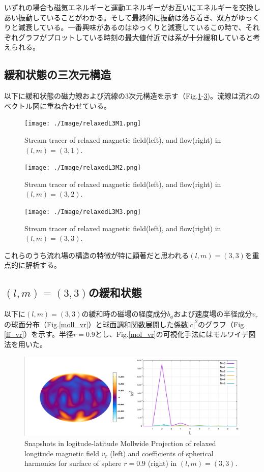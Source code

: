 \documentclass[12pt]{jsarticle}
\begin{document}
いずれの場合も磁気エネルギーと運動エネルギーがお互いにエネルギーを交換しあい振動していることがわかる。そして最終的に振動は落ち着き、双方がゆっくりと減衰している。一番興味があるのはゆっくりと減衰しているこの時で、それぞれグラフがプロットしている時刻の最大値付近では系が十分緩和していると考えられる。


\subsection{緩和状態の三次元構造}
以下に緩和状態の磁力線および流線の3次元構造を示す（Fig.\ref{L3M1_relaxed}-\ref{L3M3_relaxed})。流線は流れのベクトル図に重ね合わせている。

\begin{figure}[H]
\centering
\texttt{[image: ./Image/relaxedL3M1.png]}
\caption{Stream tracer of relaxed magnetic field(left), and flow(right) in $(l,m)=(3,1)$.} \label{L3M1_relaxed}
\end{figure}
\begin{figure}[H]
\centering
\texttt{[image: ./Image/relaxedL3M2.png]}
\caption{Stream tracer of relaxed magnetic field(left), and flow(right) in $(l,m)=(3,2)$.} \label{L3M2_relaxed}
\end{figure}
\begin{figure}[H]
\centering
\texttt{[image: ./Image/relaxedL3M3.png]}
\caption{Stream tracer of relaxed magnetic field(left), and flow(right) in $(l,m)=(3,3)$.}\label{L3M3_relaxed}
\end{figure}

これらのうち流れ場の構造の特徴が特に顕著だと思われる$(l,m)=(3,3)$を重点的に解析する。

\subsection{$(l,m)=(3,3)$の緩和状態}
以下に$(l,m)=(3,3)$の緩和時の磁場の経度成分$b_\phi$および速度場の半径成分$v_r$の球面分布（Fig.\ref{moll_vr}）と球面調和関数展開した係数${|c|}^2$のグラフ（Fig.\ref{ff_vr}）を示す。半径$r=0.9$とし、Fig.\ref{mol_vr}の可視化手法にはモルワイデ図法を用いた。

\begin{figure}[H]
\centering
\includegraphics[height=0.5\textheight,width=1.0\hsize,angle=0,keepaspectratio]{./Image/vr_L3M3.png}
\caption{Snapshots in logitude-latitude Mollwide Projection of relaxed longitude magnetic field $v_r$ (left) and coefficients of spherical harmonics for surface of sphere $r=0.9$ (right) in $(l,m)=(3,3)$.}\label{vr_L3M3}
\end{figure}
\end{document}
